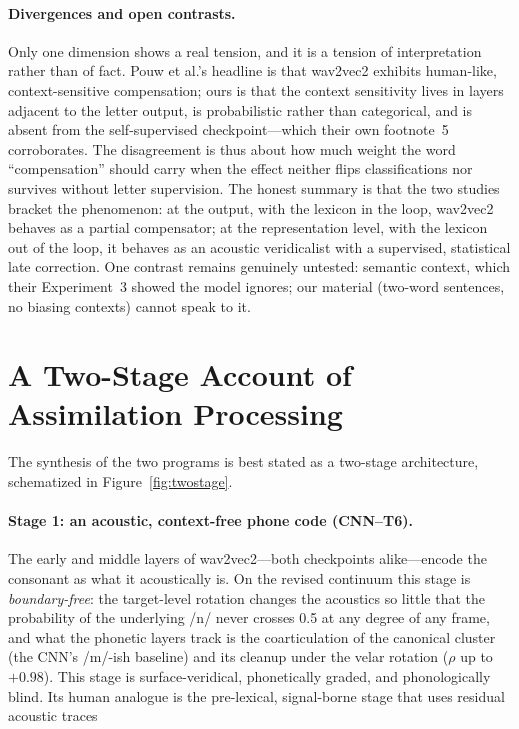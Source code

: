 \documentclass[11pt,a4paper]{article}
\begin{document}
\paragraph{Divergences and open contrasts.}
Only one dimension shows a real tension, and it is a tension of
interpretation rather than of fact. Pouw et al.'s headline is that
wav2vec2 exhibits human-like, context-sensitive compensation; ours is
that the context sensitivity lives in layers adjacent to the letter
output, is probabilistic rather than categorical, and is absent from
the self-supervised checkpoint---which their own footnote~5
corroborates. The disagreement is thus about how much weight the word
``compensation'' should carry when the effect neither flips
classifications nor survives without letter supervision. The honest
summary is that the two studies bracket the phenomenon: at the output,
with the lexicon in the loop, wav2vec2 behaves as a partial
compensator; at the representation level, with the lexicon out of the
loop, it behaves as an acoustic veridicalist with a supervised,
statistical late correction. One contrast remains genuinely untested:
semantic context, which their Experiment~3 showed the model ignores;
our material (two-word sentences, no biasing contexts) cannot speak to
it.

\needspace{0.22\textheight}
\section{A Two-Stage Account of Assimilation Processing}\label{sec:twostage}

The synthesis of the two programs is best stated as a two-stage
architecture, schematized in Figure~\ref{fig:twostage}.

\paragraph{Stage 1: an acoustic, context-free phone code
(CNN--T6).}
The early and middle layers of wav2vec2---both checkpoints
alike---encode the consonant as what it acoustically is. On the
revised continuum this stage is \emph{boundary-free}: the target-level
rotation changes the acoustics so little that the probability of the
underlying /n/ never crosses 0.5 at any degree of any frame, and what
the phonetic layers track is the coarticulation of the canonical
cluster (the CNN's /m/-ish baseline) and its cleanup under the velar
rotation ($\rho$ up to $+0.98$). This stage is surface-veridical,
phonetically graded, and phonologically blind. Its human analogue is
the pre-lexical, signal-borne stage that uses residual acoustic traces
\end{document}
